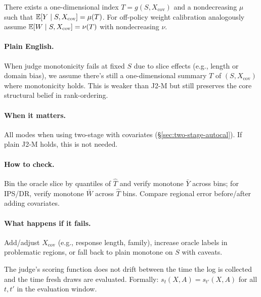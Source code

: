 \begin{assumption}
\label{assump:j2mx}
There exists a one-dimensional index $T=g(S,X_{\mathrm{cov}})$ and a nondecreasing $\mu$ such that
$\operatorname{\mathbb{E}}[Y\mid S,X_{\mathrm{cov}}]=\mu(T)$.
For off-policy weight calibration analogously assume
$\operatorname{\mathbb{E}}[W\mid S,X_{\mathrm{cov}}]=\nu(T)$ with nondecreasing $\nu$.
\end{assumption}

\paragraph{Plain English.} When judge monotonicity fails at fixed $S$ due to slice effects (e.g., length or domain bias), we assume there's still a one-dimensional summary $T$ of $(S, X_{\mathrm{cov}})$ where monotonicity holds. This is weaker than J2-M but still preserves the core structural belief in rank-ordering.

\paragraph{When it matters.} All modes when using two-stage \autocal{} with covariates (\S\ref{sec:two-stage-autocal}). If plain J2-M holds, this is not needed.

\paragraph{How to check.} Bin the oracle slice by quantiles of $\widehat T$ and verify monotone $\bar Y$ across bins; for IPS/DR, verify monotone $\bar W$ across $\widehat T$ bins. Compare regional error before/after adding covariates.

\paragraph{What happens if it fails.} Add/adjust $X_{\mathrm{cov}}$ (e.g., response length, family), increase oracle labels in problematic regions, or fall back to plain monotone on $S$ with caveats.

\begin{assumption}
\label{assum:stability}
The judge's scoring function does not drift between the time the log is collected and the time fresh draws are evaluated. Formally: $s_t(X, A) = s_{t'}(X, A)$ for all $t, t'$ in the evaluation window.
\end{assumption}

